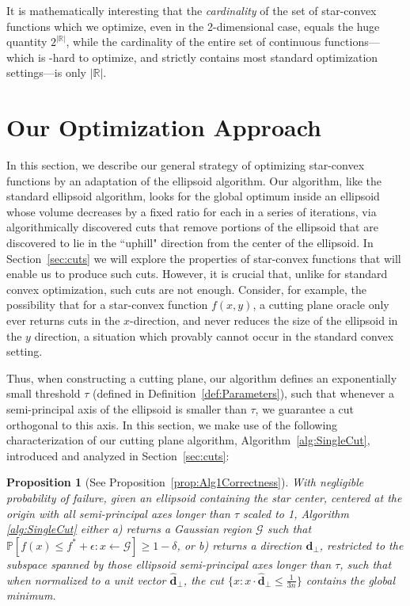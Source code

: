 \documentclass[11pt,letter]{article}
\renewcommand{\Pr}{\mathbb{P}}
\newcommand{\from}{\leftarrow}
\renewcommand{\vec}[1]{\mathbf{#1}}
\newcommand{\ferr}{\epsilon}
\newcommand{\perr}{\delta}
\numberwithin{nTheorems}{section}
\newtheorem*{proposition*}{Proposition}
\begin{document}
It is mathematically interesting that the \emph{cardinality} of the set of star-convex functions which we optimize, even in the 2-dimensional case, equals the huge quantity $2^{|\mathbb{R}|}$, while the cardinality of the entire set of continuous functions---which is \NP-hard to optimize, and strictly contains most standard optimization settings---is only $|\mathbb{R}|$.

\section{Our Optimization Approach}\label{sec:ellipsoid}

In this section, we describe our general strategy of optimizing star-convex functions by an adaptation of the ellipsoid algorithm. Our algorithm, like the standard ellipsoid algorithm, looks for the global optimum inside an ellipsoid whose volume decreases by a fixed ratio for each in a series of iterations, via algorithmically discovered cuts that remove portions of the ellipsoid that are discovered to lie in the ``uphill" direction from the center of the ellipsoid.
In Section~\ref{sec:cuts} we will explore the properties of star-convex functions that will enable us to produce such cuts. However, it is crucial that, unlike for standard convex optimization, such cuts are not enough. Consider, for example, the possibility that for a star-convex function $f(x,y)$, a cutting plane oracle only ever returns cuts in the $x$-direction, and never reduces the size of the ellipsoid in the $y$ direction, a situation which provably cannot occur in the standard convex setting.

Thus, when constructing a cutting plane, our algorithm defines an exponentially small threshold $\tau$ (defined in Definition~\ref{def:Parameters}), such that whenever a semi-principal axis of the ellipsoid is smaller than $\tau$, we guarantee a cut orthogonal to this axis. In this section, we make use of the following characterization of our cutting plane algorithm, Algorithm~\ref{alg:SingleCut}, introduced and analyzed in Section~\ref{sec:cuts}:

\begin{proposition*}[See Proposition~\ref{prop:Alg1Correctness}]
With negligible probability of failure, given an ellipsoid containing the star center, centered at the origin with all semi-principal axes longer than $\tau$ scaled to 1, Algorithm \ref{alg:SingleCut} either a) returns a Gaussian region $\mathcal{G}$ such that $\Pr[f(x) \le f^\ast+\ferr : x \from \mathcal{G}] \ge 1 - \perr$, or b) returns a direction $\vec{d}_\bot$, restricted to the subspace spanned by those ellipsoid semi-principal axes longer than $\tau$, such that when normalized to a unit vector $\hat{\vec{d}}_\bot$, the cut $\{x:x\cdot \hat{\vec{d}}_\bot\leq \frac{1}{3n}\}$ contains the global minimum.
\end{proposition*}
\end{document}
